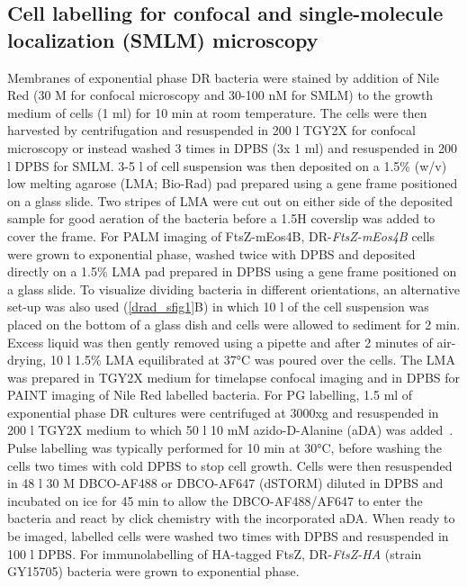 \subsection{Cell labelling for confocal and single-molecule localization (SMLM) microscopy}

Membranes of exponential phase DR bacteria were stained by addition of Nile Red (30 \mu{}M for confocal microscopy and 30-100 nM for SMLM) to the growth medium of cells (1 ml) for 10 min at room temperature.
The cells were then harvested by centrifugation and resuspended in 200 \mu{}l TGY2X for confocal microscopy or instead washed 3 times in DPBS (3x 1 ml) and resuspended in 200 \mu{}l DPBS for SMLM.
3-5 \nu{}l of cell suspension was then deposited on a 1.5\% (w/v) low melting agarose (LMA; Bio-Rad) pad prepared using a gene frame positioned on a glass slide.
Two stripes of LMA were cut out on either side of the deposited sample for good aeration of the bacteria before a 1.5H coverslip was added to cover the frame.
For PALM imaging of FtsZ-mEos4B, DR-\textit{FtsZ-mEos4B} cells were grown to exponential phase, washed twice with DPBS and deposited directly on a 1.5\% LMA pad prepared in DPBS using a gene frame positioned on a glass slide.
To visualize dividing bacteria in different orientations, an alternative set-up was also used (\autoref{drad_sfig1}B) in which 10 \mu{}l of the cell suspension was placed on the bottom of a glass dish and cells were allowed to sediment for 2 min.
Excess liquid was then gently removed using a pipette and after 2 minutes of air-drying, 10 \mu{}l 1.5\% LMA equilibrated at \ang{37}C was poured over the cells.
The LMA was prepared in TGY2X medium for timelapse confocal imaging and in DPBS for PAINT imaging of Nile Red labelled bacteria.
For PG labelling, 1.5 ml of exponential phase DR cultures were centrifuged at 3000xg and resuspended in 200 \mu{}l TGY2X medium to which 50 \mu{}l 10 mM azido-D-Alanine (aDA) was added~\cite{trouveNanoscaleDynamicsPeptidoglycan2021,trouveMetabolicBiorthogonalLabeling2021}.
Pulse labelling was typically performed for 10 min at \ang{30}C, before washing the cells two times with cold DPBS to stop cell growth.
Cells were then resuspended in 48 \mu{}l 30 \mu{}M DBCO-AF488 or DBCO-AF647 (dSTORM) diluted in DPBS and incubated on ice for 45 min to allow the DBCO-AF488/AF647 to enter the bacteria and react by click chemistry with the incorporated aDA.
When ready to be imaged, labelled cells were washed two times with DPBS and resuspended in 100 \mu{}l DPBS.
For immunolabelling of HA-tagged FtsZ, DR-\textit{FtsZ-HA} (strain GY15705) bacteria were grown to exponential phase.
